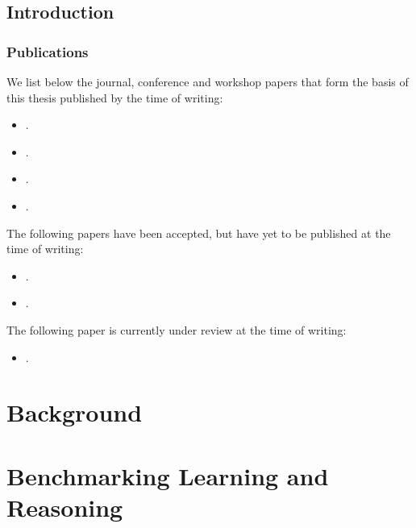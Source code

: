 \documentclass[a4paper,twoside,openright]{book}
\theoremstyle{plain}
\theoremstyle{definition}
\begin{document}
\chapter{Introduction}
\label{chap:intro}


\section{Publications}


We list below the journal, conference and workshop papers that form the basis of this thesis published by the time of writing:
%
\begin{itemize}
\nobibliography*
    \item \cite{lorello2023challenge} .
    \item \cite{manhaeve2024benchmarking} .
    \item \cite{lorello2025kandy} .
    \item \cite{lorello2024continual} .
 \end{itemize}
%
The following papers have been accepted, but have yet to be published at the time of writing:
%
\begin{itemize}
	\nobibliography*
	\item \cite{lorello2025neuro} .
	\item \cite{lorello2025ansya} .
\end{itemize}
%
The following paper is currently under review at the time of writing:
%
\begin{itemize}
\nobibliography*
    \item \cite{lorello2025ltlzinc} .
\end{itemize}

\part{Background}






\part{Benchmarking Learning and Reasoning}



\end{document}

